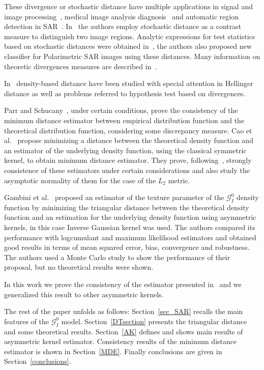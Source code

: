 \documentclass[journal]{IEEEtran}
\numberwithin{equation}{section}
\begin{document}
These divergence or stochastic distance have multiple applications in signal and image processing~\cite{4218961}, medical image analysis diagnosis~\cite{5599869} and automatic region detection in SAR~\cite{EdgeDetectionDistancesEntropiesJSTARS,SARSegmentationLevelSetGA0}. In~\cite{Nascimento2009} the authors employ stochastic distance as a contrast measure to distinguish two image regions. Analytic expressions for test statistics based on stochastic distances were obtained in~\cite{ClassificationPolSARSegmentsMinimizationWishartDistances}, the authors also proposed new classifier for Polarimetric SAR images using these distances. Many information on theoretic divergences measures are described in~\cite{Liese2006}.

In~\cite{Basu2011} density-based distance have been studied with special attention in Hellinger distance as well as problems referred to hypothesis test based on divergences.

Parr and Schucany~\cite{parr1982}, under certain conditions, prove the consistency of the minimum distance estimator between empirical distribution function and the theoretical distribution function, considering some discrepancy measure. Cao et al.~\cite{cao1995minimum} propose minimizing a distance between the theoretical density function and an estimator of the underlying density function, using the classical symmetric kernel,  to obtain minimum distance estimator. They prove, following~\cite{parr1982}, strongly consistence of these estimators under certain considerations and also study the asymptotic normality of them for the case of the $L_2$ metric. 

Gambini et al.~\cite{gambini2015} proposed an estimator of the texture parameter of the $\mathcal{G}_I^0$ density function by  minimizing the triangular distance between the theoretical density function  and an estimation for the underlying density function using asymmetric kernels, in this case Inverse Gaussian kernel was used. The authors compared its performance with logcumulant and maximum likelihood estimators and obtained good results in terms of mean squared error, bias, convergence and robustness. 
The authors used a Monte Carlo study to show the performance of their proposal, but no theoretical results were shown.

In this work we prove the consistency of the estimator presented in~\cite{gambini2015} and we generalized this result to other asymmetric kernels.

The rest of the paper unfolds as follows: 
Section~\ref{sec_SAR} recalls the main features of the $\mathcal{G}_I^0$ model.
Section~\ref{DTsection} presents the triangular distance and some theoretical results. 
Section~\ref{AK} defines and shows main results of asymmetric kernel estimator.
Consistency results of the minimum distance estimator is shown in Section~\ref{MDE}. Finally conclusions are given in Section~\ref{conclusions}.
\end{document}
